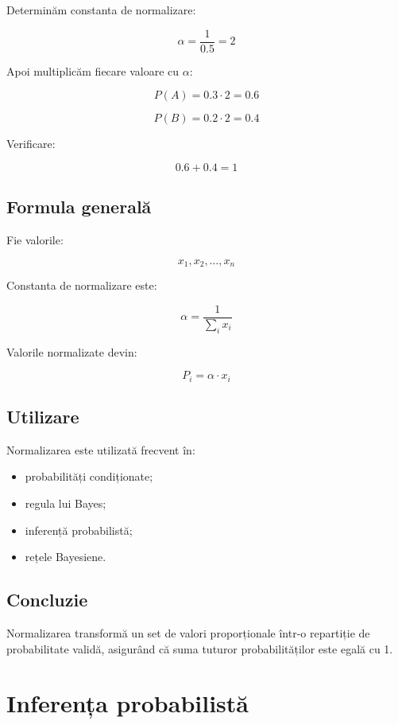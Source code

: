 \documentclass[12pt,a4paper]{article}
\begin{document}
Determinăm constanta de normalizare:

\[
\alpha=\frac{1}{0.5}=2
\]

Apoi multiplicăm fiecare valoare cu \(\alpha\):

\[
P(A)=0.3 \cdot 2 = 0.6
\]

\[
P(B)=0.2 \cdot 2 = 0.4
\]

Verificare:

\[
0.6+0.4=1
\]

\subsection{Formula generală}

Fie valorile:

\[
x_1,x_2,\dots,x_n
\]

Constanta de normalizare este:

\[
\alpha
=
\frac{1}
{\sum_i x_i}
\]

Valorile normalizate devin:

\[
P_i=\alpha \cdot x_i
\]

\subsection{Utilizare}

Normalizarea este utilizată frecvent în:

\begin{itemize}
\item probabilități condiționate;
\item regula lui Bayes;
\item inferență probabilistă;
\item rețele Bayesiene.
\end{itemize}

\subsection{Concluzie}

Normalizarea transformă un set de valori proporționale într-o repartiție de probabilitate validă, asigurând că suma tuturor probabilităților este egală cu 1.









\section{Inferența probabilistă}
\end{document}
